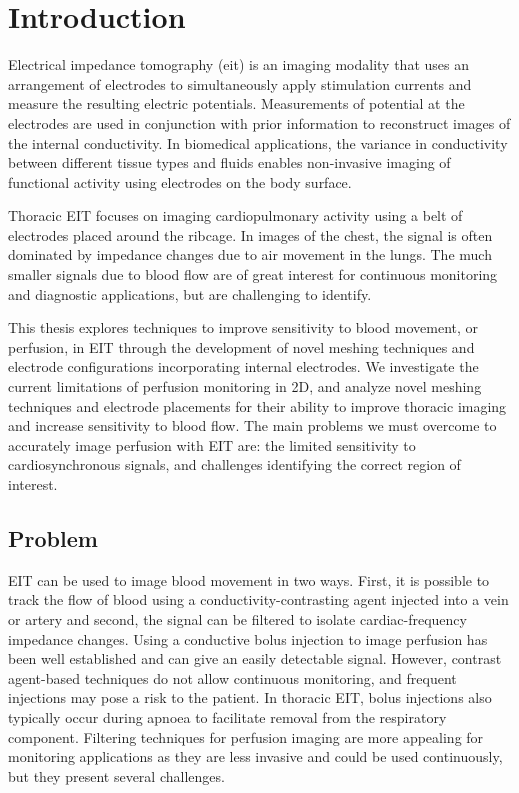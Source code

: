\chapter{Introduction}

Electrical impedance tomography (\acrshort{eit}) is an imaging modality that uses an arrangement 
of electrodes to simultaneously apply 
stimulation currents and measure 
the resulting electric potentials. Measurements of potential at the 
electrodes are used in conjunction with 
prior information to reconstruct images 
of the internal conductivity. In biomedical applications, 
the variance in conductivity between different 
tissue types and fluids enables non-invasive 
imaging of functional activity using electrodes on the 
body surface. 

Thoracic EIT focuses on imaging cardiopulmonary activity
using a belt of electrodes placed around the ribcage.
In images of the chest, the signal is often dominated by 
impedance changes due to air movement in the lungs. 
The much smaller signals due to blood flow are of great interest for 
continuous monitoring and diagnostic applications,
but are challenging to identify. 

This thesis explores techniques to improve sensitivity to blood movement, or perfusion,  
in EIT through the development of novel meshing techniques and electrode configurations
incorporating internal electrodes. 
We investigate the current limitations of perfusion monitoring in 2D, and
analyze novel meshing techniques and electrode placements for their 
ability to improve thoracic imaging and increase sensitivity to blood flow. 
The main problems we must overcome to accurately 
image perfusion with EIT are: the limited sensitivity 
to cardiosynchronous signals, and challenges identifying 
the correct region of interest.

\section{Problem}

EIT can be used to image blood movement in two ways. 
First, it is possible to track the flow of blood using a 
conductivity-contrasting agent injected into a vein or artery
and second, the signal can be filtered to isolate cardiac-frequency 
impedance changes. 
Using a conductive bolus injection to image perfusion has been well established and 
can give an easily detectable signal. 
However, contrast agent-based techniques do not 
allow continuous monitoring, and frequent injections may pose 
a risk to the patient.
In thoracic EIT, bolus injections also typically occur during apnoea to 
facilitate removal from the respiratory component.
Filtering techniques for perfusion imaging are more appealing for 
monitoring applications as they are less invasive 
and could be used continuously, but they present several challenges. 

